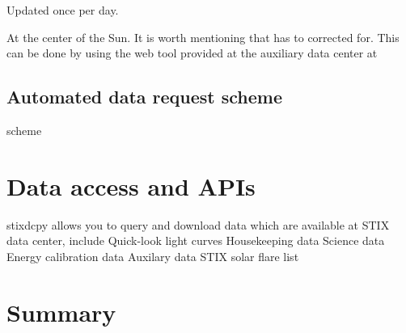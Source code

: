 \documentclass{aa}
\begin{document}
Updated once per day.

At the center of the Sun.
It is worth mentioning that has to corrected for.
This can be done by using the web tool provided at the auxiliary data center at

\subsection{Automated data request scheme}
scheme


\section{Data access and APIs}
stixdcpy allows you to query and download data which are available at STIX data center, include
Quick-look light curves
Housekeeping data
Science data
Energy calibration data
Auxilary data
STIX solar flare list


\section{Summary}
\label{sec:summary}



%
%



\end{document}

